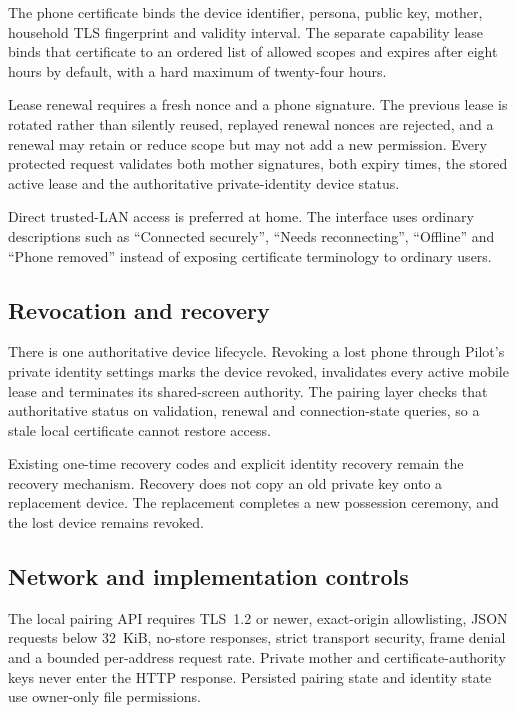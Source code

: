 The phone certificate binds the device identifier, persona, public key, mother, household TLS
fingerprint and validity interval.  The separate capability lease binds that certificate to an
ordered list of allowed scopes and expires after eight hours by default, with a hard maximum of
twenty-four hours.

Lease renewal requires a fresh nonce and a phone signature.  The previous lease is rotated rather
than silently reused, replayed renewal nonces are rejected, and a renewal may retain or reduce
scope but may not add a new permission.  Every protected request validates both mother signatures,
both expiry times, the stored active lease and the authoritative private-identity device status.

Direct trusted-LAN access is preferred at home.  The interface uses ordinary descriptions such as
``Connected securely'', ``Needs reconnecting'', ``Offline'' and ``Phone removed'' instead of
exposing certificate terminology to ordinary users.

\subsection{Revocation and recovery}

There is one authoritative device lifecycle.  Revoking a lost phone through Pilot's private
identity settings marks the device revoked, invalidates every active mobile lease and terminates
its shared-screen authority.  The pairing layer checks that authoritative status on validation,
renewal and connection-state queries, so a stale local certificate cannot restore access.

Existing one-time recovery codes and explicit identity recovery remain the recovery mechanism.
Recovery does not copy an old private key onto a replacement device.  The replacement completes a
new possession ceremony, and the lost device remains revoked.

\subsection{Network and implementation controls}

The local pairing API requires TLS~1.2 or newer, exact-origin allowlisting, JSON requests below
32~KiB, no-store responses, strict transport security, frame denial and a bounded per-address
request rate.  Private mother and certificate-authority keys never enter the HTTP response.
Persisted pairing state and identity state use owner-only file permissions.

